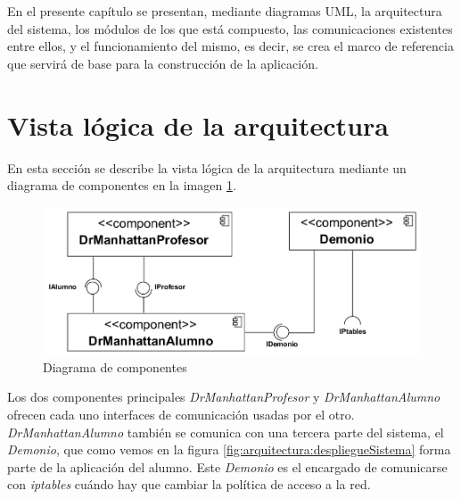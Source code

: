 

\label{chap:arquitectura}

En el presente capítulo se presentan, mediante diagramas UML, la arquitectura del sistema, los módulos de los que está compuesto, las comunicaciones existentes entre ellos, y el funcionamiento del mismo, es decir, se crea el marco de referencia que servirá de base para la construcción de la aplicación.

\chaptertoc

\section{Vista lógica de la arquitectura}
\label{sec:arquitectura:arqLogica}

En esta sección se describe la vista lógica de la arquitectura mediante un diagrama de componentes en la imagen \ref{fig:arquitectura:componentes}.
\newline


\begin{figure}
    \centering
    \includegraphics[width=\linewidth]{arquitectura/componentes}
    \caption{Diagrama de componentes}
    \label{fig:arquitectura:componentes}
\end{figure}


Los dos componentes principales \emph{DrManhattanProfesor} y \emph{DrManhattanAlumno} ofrecen cada uno interfaces de comunicación usadas por el otro. \emph{DrManhattanAlumno} también se comunica con una tercera parte del sistema, el \emph{Demonio}, que como vemos en la figura \ref{fig:arquitectura:despliegueSistema} forma parte de la aplicación del alumno. Este \emph{Demonio} es el encargado de comunicarse con \emph{iptables} cuándo hay que cambiar la política de acceso a la red.
\newline

